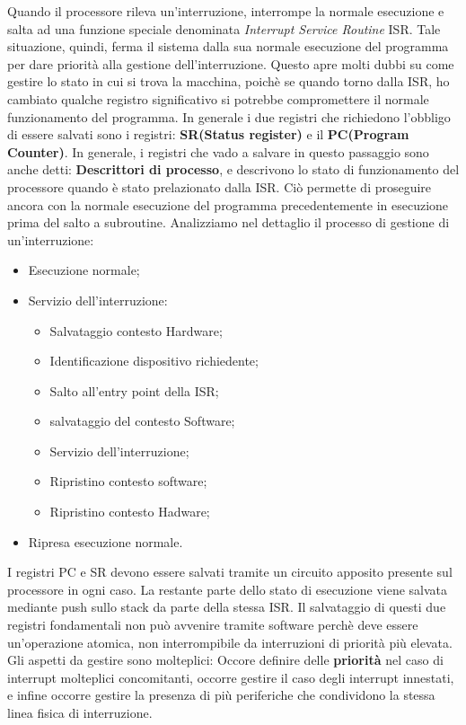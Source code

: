 Quando il processore rileva un'interruzione, interrompe la normale esecuzione e salta ad una funzione speciale denominata \textit{Interrupt Service Routine} ISR. Tale situazione, quindi, ferma il sistema dalla sua normale esecuzione del programma per dare priorità alla gestione dell'interruzione. Questo apre molti dubbi su come gestire lo stato in cui si trova la macchina, poichè se quando torno dalla ISR, ho cambiato qualche registro significativo si potrebbe compromettere il normale funzionamento del programma. In generale i due registri che richiedono l'obbligo di essere salvati sono i registri: \textbf{SR(Status register)} e il \textbf{PC(Program Counter)}. In generale, i registri che vado a salvare in questo passaggio sono anche detti: \textbf{Descrittori di processo}, e descrivono lo stato di funzionamento del processore quando è stato prelazionato dalla ISR. Ciò permette di proseguire ancora con la normale esecuzione del programma precedentemente in esecuzione prima del salto a subroutine.
Analizziamo nel dettaglio il processo di gestione di un'interruzione:

\begin{itemize}
    \item Esecuzione normale;
    \item Servizio dell'interruzione:
    \begin{itemize}
        \item Salvataggio contesto Hardware;
        \item Identificazione dispositivo richiedente;
        \item Salto all'entry point della ISR;
        \item salvataggio del contesto Software;
        \item Servizio dell'interruzione;
        \item Ripristino contesto software;
        \item Ripristino contesto Hadware;
    \end{itemize}
    \item Ripresa esecuzione normale.
\end{itemize}

I registri PC e SR devono essere salvati tramite un circuito apposito presente sul processore in ogni caso. La restante parte dello stato di esecuzione viene salvata mediante push sullo stack da parte della stessa ISR. Il salvataggio di questi due registri fondamentali non può avvenire tramite software perchè deve essere un'operazione atomica, non interrompibile da interruzioni di priorità più elevata. 
Gli aspetti da gestire sono molteplici:
Occore definire delle \textbf{priorità} nel caso di interrupt molteplici concomitanti, occorre gestire il caso degli interrupt innestati, e infine occorre gestire la presenza di più periferiche che condividono la stessa linea fisica di interruzione.


